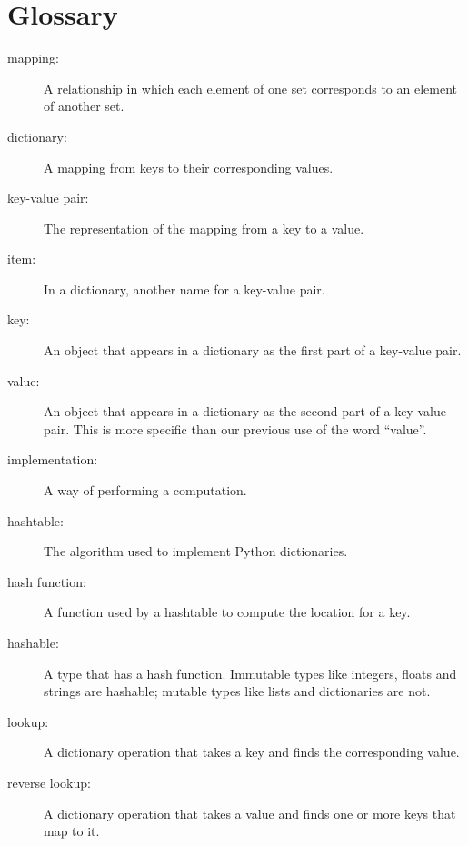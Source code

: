 \documentclass[
DIV=11,
fontsize=12,
twoside,
headinclude=false,
titlepage=firstiscover,
abstract=true,
headsepline=true,
footsepline=true,
chapterprefix=true, %
headings=big,
bibliography=totoc,%
captions=tableheading
]{scrbook}
\theoremstyle{definition}
\begin{document}
\section{Glossary}

\begin{description}

\item[mapping:] A relationship in which each element of one set
corresponds to an element of another set.

\item[dictionary:] A mapping from keys to their
corresponding values.

\item[key-value pair:] The representation of the mapping from
a key to a value.

\item[item:] In a dictionary, another name for a key-value
  pair.

\item[key:] An object that appears in a dictionary as the
first part of a key-value pair.

\item[value:] An object that appears in a dictionary as the
second part of a key-value pair.  This is more specific than
our previous use of the word ``value''.

\item[implementation:] A way of performing a computation.

\item[hashtable:] The algorithm used to implement Python
dictionaries.

\item[hash function:] A function used by a hashtable to compute the
location for a key.

\item[hashable:] A type that has a hash function.  Immutable
types like integers,
floats and strings are hashable; mutable types like lists and
dictionaries are not.

\item[lookup:] A dictionary operation that takes a key and finds
the corresponding value.

\item[reverse lookup:] A dictionary operation that takes a value and finds
one or more keys that map to it.


\end{description}
\end{document}

